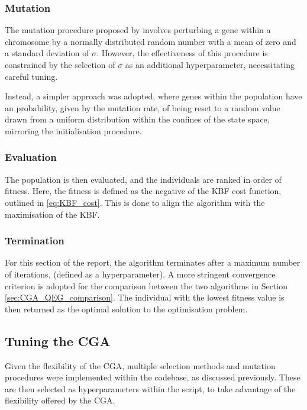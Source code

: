 \documentclass[10pt]{article}
\begin{document}
\begin{multicols}{2}
\subsubsection{Mutation}

The mutation procedure proposed by \cite{PGA} involves perturbing a gene within a chromosome by a normally distributed random number with a mean of zero and a standard deviation of $\sigma$. However, the effectiveness of this procedure is constrained by the selection of $\sigma$ as an additional hyperparameter, necessitating careful tuning. 

Instead, a simpler approach was adopted, where genes within the population have an probability, given by the mutation rate, of being reset to a random value drawn from a uniform distribution within the confines of the state space, mirroring the initialisation procedure.

\subsubsection{Evaluation}

The population is then evaluated, and the individuals are ranked in order of fitness. Here, the fitness is defined as the negative of the KBF cost function, outlined in \ref{eq:KBF_cost}. This is done to align the algorithm with the maximisation of the KBF.

\subsubsection{Termination}

For this section of the report, the algorithm terminates after a maximum number of iterations, (defined as a hyperparameter). A more stringent convergence criterion is adopted for the comparison between the two algorithms in Section \ref{sec:CGA_QEG_comparison}. The individual with the lowest fitness value is then returned as the optimal solution to the optimisation problem.

\subsection{Tuning the CGA}
\label{sec:CGA_selection_mutation}

Given the flexibility of the CGA, multiple selection methods and mutation procedures were implemented within the codebase, as discussed previously. These are then selected as hyperparameters within the script, %
to take advantage of the flexibility offered by the CGA. 


\end{multicols}
\end{document}
